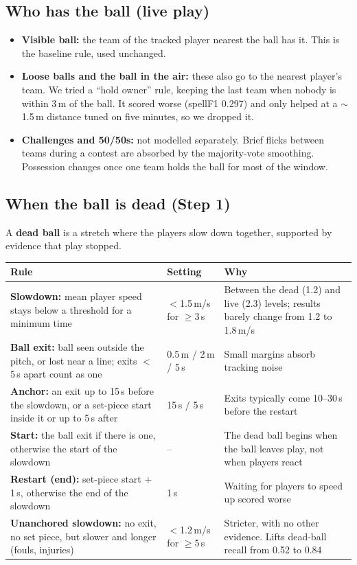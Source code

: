 \documentclass[10pt,a4paper]{article}
\begin{document}
\subsection{Who has the ball (live play)}
\begin{itemize}
  \item \textbf{Visible ball:} the team of the tracked player nearest the ball has it. This is the baseline rule,
        used unchanged.
  \item \textbf{Loose balls and the ball in the air:} these also go to the nearest player's team. We tried a
        ``hold owner'' rule, keeping the last team when nobody is within 3\,m of the ball. It scored worse
        (spellF1 0.297) and only helped at a $\sim$1.5\,m distance tuned on five minutes, so we dropped it.
  \item \textbf{Challenges and 50/50s:} not modelled separately. Brief flicks between teams during a contest are
        absorbed by the majority-vote smoothing. Possession changes once one team holds the ball for most of
        the window.
\end{itemize}

\subsection{When the ball is dead (Step 1)}

A \textbf{dead ball} is a stretch where the players slow down together, supported by evidence that play stopped.

\begin{table}[h]
\small
\begin{tabularx}{\linewidth}{@{}p{5.6cm}p{3.0cm}Y@{}}
\toprule
\textbf{Rule} & \textbf{Setting} & \textbf{Why} \\
\midrule
\textbf{Slowdown:} mean player speed stays below a threshold for a minimum time
  & $<$1.5\,m/s for $\geq$3\,s & Between the dead (1.2) and live (2.3) levels; results barely change from 1.2 to 1.8\,m/s \\
\textbf{Ball exit:} ball seen outside the pitch, or lost near a line; exits $<$5\,s apart count as one
  & 0.5\,m / 2\,m / 5\,s & Small margins absorb tracking noise \\
\textbf{Anchor:} an exit up to 15\,s before the slowdown, or a set-piece start inside it or up to 5\,s after
  & 15\,s / 5\,s & Exits typically come 10--30\,s before the restart \\
\textbf{Start:} the ball exit if there is one, otherwise the start of the slowdown
  & -- & The dead ball begins when the ball leaves play, not when players react \\
\textbf{Restart (end):} set-piece start + 1\,s, otherwise the end of the slowdown
  & 1\,s & Waiting for players to speed up scored worse \\
\textbf{Unanchored slowdown:} no exit, no set piece, but slower and longer (fouls, injuries)
  & $<$1.2\,m/s for $\geq$5\,s & Stricter, with no other evidence. Lifts dead-ball recall from 0.52 to 0.84 \\
\bottomrule
\end{tabularx}
\end{table}
\end{document}
